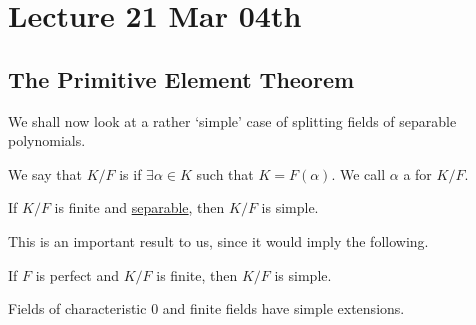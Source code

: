 \documentclass[notoc,notitlepage]{tufte-book}
\begin{document}


\chapter{Lecture 21 Mar 04th}%
\label{chp:lecture_21_mar_04th}

\section{The Primitive Element Theorem}%
\label{sec:the_primitive_element_theorem}

We shall now look at a rather `simple' case of splitting fields of separable
polynomials.

\begin{defn}\label{defn:simple_extension_and_primitive_elements}
  We say that $K / F$ is  if $\exists \alpha \in K$ such that $K
  = F(\alpha)$. We call $\alpha$ a  for $K / F$.
\end{defn}

\begin{thm}\label{thm:primitive_element_theorem}
  If $K / F$ is finite and
  \hyperref[defn:separable_elements_and_separable_extensions]{separable}, then
  $K / F$ is simple.
\end{thm}

This is an important result to us, since it would imply the following.

\begin{crly}\label{crly:finite_extensions_of_perfect_fields_are_simple}
  If $F$ is perfect and $K / F$ is finite, then $K / F$ is simple.
\end{crly}

\begin{eg}
  Fields of characteristic $0$ and finite fields have simple extensions.
\end{eg}
\end{document}

